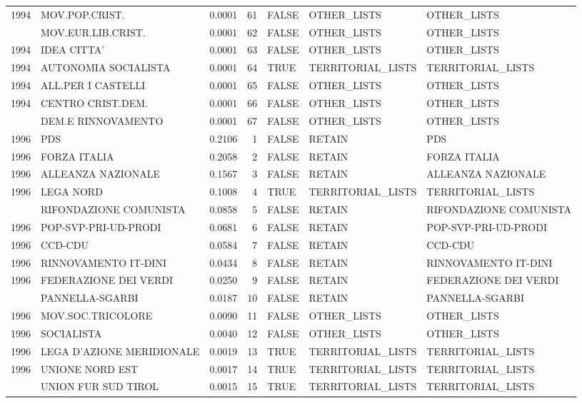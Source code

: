\begin{longtable}[t]{rlrrlll}
1994 & MOV.POP.CRIST. & 0.0001 & 61 & FALSE & OTHER\_LISTS & OTHER\_LISTS\\
\addlinespace
1994 & MOV.EUR.LIB.CRIST. & 0.0001 & 62 & FALSE & OTHER\_LISTS & OTHER\_LISTS\\
1994 & IDEA CITTA' & 0.0001 & 63 & FALSE & OTHER\_LISTS & OTHER\_LISTS\\
1994 & AUTONOMIA SOCIALISTA & 0.0001 & 64 & TRUE & TERRITORIAL\_LISTS & TERRITORIAL\_LISTS\\
1994 & ALL.PER I CASTELLI & 0.0001 & 65 & FALSE & OTHER\_LISTS & OTHER\_LISTS\\
1994 & CENTRO CRIST.DEM. & 0.0001 & 66 & FALSE & OTHER\_LISTS & OTHER\_LISTS\\
\addlinespace
1994 & DEM.E RINNOVAMENTO & 0.0001 & 67 & FALSE & OTHER\_LISTS & OTHER\_LISTS\\
1996 & PDS & 0.2106 & 1 & FALSE & RETAIN & PDS\\
1996 & FORZA ITALIA & 0.2058 & 2 & FALSE & RETAIN & FORZA ITALIA\\
1996 & ALLEANZA NAZIONALE & 0.1567 & 3 & FALSE & RETAIN & ALLEANZA NAZIONALE\\
1996 & LEGA NORD & 0.1008 & 4 & TRUE & TERRITORIAL\_LISTS & TERRITORIAL\_LISTS\\
\addlinespace
1996 & RIFONDAZIONE COMUNISTA & 0.0858 & 5 & FALSE & RETAIN & RIFONDAZIONE COMUNISTA\\
1996 & POP-SVP-PRI-UD-PRODI & 0.0681 & 6 & FALSE & RETAIN & POP-SVP-PRI-UD-PRODI\\
1996 & CCD-CDU & 0.0584 & 7 & FALSE & RETAIN & CCD-CDU\\
1996 & RINNOVAMENTO IT-DINI & 0.0434 & 8 & FALSE & RETAIN & RINNOVAMENTO IT-DINI\\
1996 & FEDERAZIONE DEI VERDI & 0.0250 & 9 & FALSE & RETAIN & FEDERAZIONE DEI VERDI\\
\addlinespace
1996 & PANNELLA-SGARBI & 0.0187 & 10 & FALSE & RETAIN & PANNELLA-SGARBI\\
1996 & MOV.SOC.TRICOLORE & 0.0090 & 11 & FALSE & OTHER\_LISTS & OTHER\_LISTS\\
1996 & SOCIALISTA & 0.0040 & 12 & FALSE & OTHER\_LISTS & OTHER\_LISTS\\
1996 & LEGA D'AZIONE MERIDIONALE & 0.0019 & 13 & TRUE & TERRITORIAL\_LISTS & TERRITORIAL\_LISTS\\
1996 & UNIONE NORD EST & 0.0017 & 14 & TRUE & TERRITORIAL\_LISTS & TERRITORIAL\_LISTS\\
\addlinespace
1996 & UNION FUR SUD TIROL & 0.0015 & 15 & TRUE & TERRITORIAL\_LISTS & TERRITORIAL\_LISTS\\

\end{longtable}
